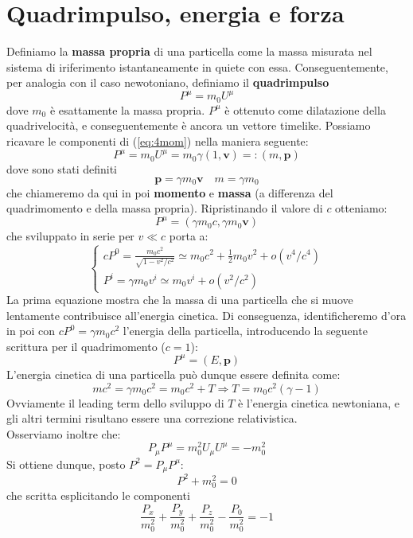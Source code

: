 \documentclass[a4paper,11pt]{book}
\theoremstyle{plain}
\theoremstyle{definition}
\begin{document}
\section{Quadrimpulso, energia e forza}
Definiamo la \textbf{massa propria} di una particella come la massa misurata nel sistema di iriferimento istantaneamente in quiete con essa. Conseguentemente, per analogia con il caso newotoniano, definiamo il \textbf{quadrimpulso}
\begin{equation}\label{eq:4mom}
P^{\mu}=m_0U^{\mu}
\end{equation}
dove $m_0$ è esattamente la massa propria. $P^{\mu}$ è ottenuto come dilatazione della quadrivelocità, e conseguentemente è ancora un vettore timelike. Possiamo ricavare le componenti di (\ref{eq:4mom}) nella maniera seguente:
\[
P^{\mu} = m_0U^{\mu}=m_0\gamma(1,\textbf{v}) =: (m,\textbf{p})
\]
dove sono stati definiti
\[
\textbf{p}=\gamma m_0\textbf{v} \quad m=\gamma m_0
\]
che chiameremo da qui in poi \textbf{momento} e \textbf{massa} (a differenza del quadrimomento e della massa propria). Ripristinando il valore di $c$ otteniamo:
\[
P^{\mu} = (\gamma m_0c, \gamma m_0\textbf{v})
\]
che sviluppato in serie per $v\ll c$ porta a:
\[
\begin{cases}
cP^0 = \frac{m_0c^2}{\sqrt{1-v^2/c^2}}\simeq m_0c^2+\frac{1}{2}m_0v^2+o(v^4/c^4) \\
P^i = \gamma m_0v^i \simeq m_0v^i + o(v^2/c^2)
\end{cases}
\]
La prima equazione mostra che la massa di una particella che si muove lentamente contribuisce all'energia cinetica. Di conseguenza, identificheremo d'ora in poi con $cP^0 = \gamma m_0c^2$ l'energia della particella, introducendo la seguente scrittura per il quadrimomento ($c=1$):
\begin{equation}
P^{\mu} = (E,\textbf{p})
\end{equation}
L'energia cinetica di una particella può dunque essere definita come:
\[
mc^2 = \gamma m_0 c^2 = m_0c^2 + T \Longrightarrow T=m_0c^2(\gamma-1)
\]
Ovviamente il leading term dello sviluppo di $T$ è l'energia cinetica newtoniana, e gli altri termini risultano essere una correzione relativistica. \\
Osserviamo inoltre che:
\[
P_{\mu}P^{\mu} = m_0^2U_{\mu}U^{\mu} = -m_0^2
\]
Si ottiene dunque, posto $P^2=P_{\mu}P^{\mu}$:
\[
P^2+m_0^2=0
\]
che scritta esplicitando le componenti
\begin{equation}\label{eq:mass-shell}
\frac{P_x}{m_0^2}+\frac{P_y}{m_0^2}+\frac{P_z}{m_0^2}-\frac{P_0}{m_0^2}=-1
\end{equation}
\end{document}
